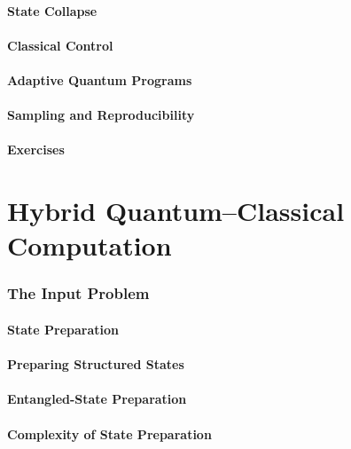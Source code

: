 \documentclass[11pt,a4paper]{article}
\begin{document}
\subsection{State Collapse}

\subsection{Classical Control}

\subsection{Adaptive Quantum Programs}

\subsection{Sampling and Reproducibility}

\subsection{Exercises}


\part{Hybrid Quantum--Classical Computation}

\section{The Input Problem}

\subsection{State Preparation}

\subsection{Preparing Structured States}

\subsection{Entangled-State Preparation}

\subsection{Complexity of State Preparation}
\end{document}
